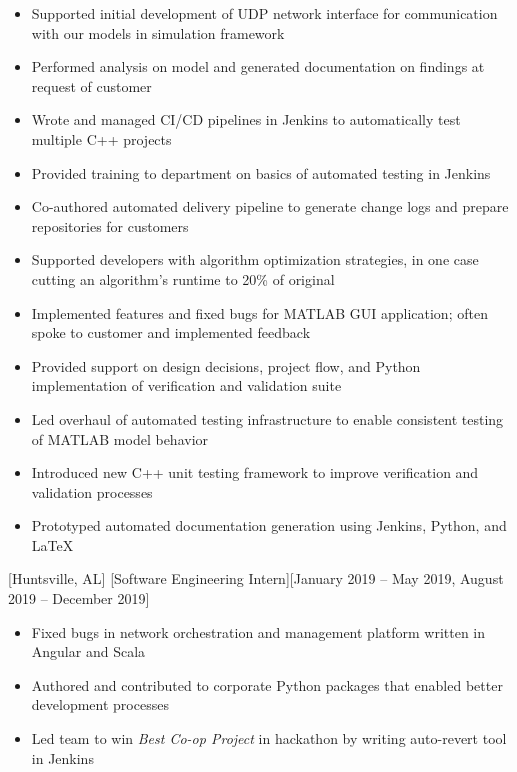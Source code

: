 \documentclass[hidelinks, 11pt]{article}
\begin{document}
\begin{itemize}
  \item Supported initial development of UDP network interface for communication with our models in simulation framework
  \item Performed analysis on model and generated documentation on findings at request of customer
  \item Wrote and managed CI/CD pipelines in Jenkins to automatically test multiple C++ projects
  \item Provided training to department on basics of automated testing in Jenkins
  \item Co-authored automated delivery pipeline to generate change logs and prepare repositories for customers
  \item Supported developers with algorithm optimization strategies, in one case cutting an algorithm's runtime to 20\% of original
  \item Implemented features and fixed bugs for MATLAB GUI application; often spoke to customer and implemented feedback
  \item Provided support on design decisions, project flow, and Python implementation of verification and validation suite
\end{itemize}


\begin{itemize}
  \item Led overhaul of automated testing infrastructure to enable consistent testing of MATLAB model behavior
  \item Introduced new C++ unit testing framework to improve verification and validation processes
  \item Prototyped automated documentation generation using Jenkins, Python, and LaTeX
\end{itemize}

[Huntsville, AL]
[Software Engineering Intern][January 2019 -- May 2019, August 2019 -- December 2019]

\begin{itemize}
  \item Fixed bugs in network orchestration and management platform written in Angular and Scala
  \item Authored and contributed to corporate Python packages that enabled better development processes
  \item Led team to win \textit{Best Co-op Project} in hackathon by writing auto-revert tool in Jenkins
\end{itemize}
\end{document}
